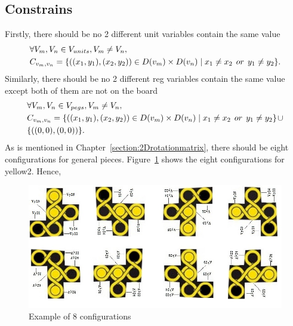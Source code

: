 \subsection{Constrains}
Firstly, there should be no 2 different unit variables contain the same value
\begin{equation}
\begin{aligned}
&\forall V_{m},V_{n} \in V_{units},V_{m} \neq V_{n},\\
&C_{v_{m},v_{n}}=\{((x_{1},y_{1}),(x_{2},y_{2}))\in D(v_{m}) \times D(v_{n})\mid x_{1} \neq x_{2}   \hspace{1ex} or \hspace{1ex}  y_{1} \neq y_{2}\}.
\end{aligned}
\end{equation}
Similarly, there should be no 2 different reg variables contain the same value except both of them are not on the board
\begin{equation}
\begin{aligned}
&\forall V_{m},V_{n}\in V_{pegs}, V_{m} \neq V_{n},\\
&C_{v_{m},v_{n}}=\{((x_{1},y_{1}),(x_{2},y_{2}))\in D(v_{m})\times D(v_{n})\mid x_{1} \neq x_{2}   \hspace{1ex} or \hspace{1ex}  y_{1} \neq y_{2}\}\hspace{1pt}\cup \\
&\{((0,0),(0,0))\}.
\end{aligned}
\end{equation}
As is mentioned in Chapter~\ref{section:2Drotationmatrix}, there should be eight configurations for general pieces. Figure~\ref{fig:Exampleof8} shows the eight configurations for yellow2. Hence,
\begin{figure}[htbp]
\centering
\includegraphics[width =\textwidth]{figs/domainexplain.jpg}
    \caption{Example of 8 configurations}
    \label{fig:Exampleof8}
\end{figure}
